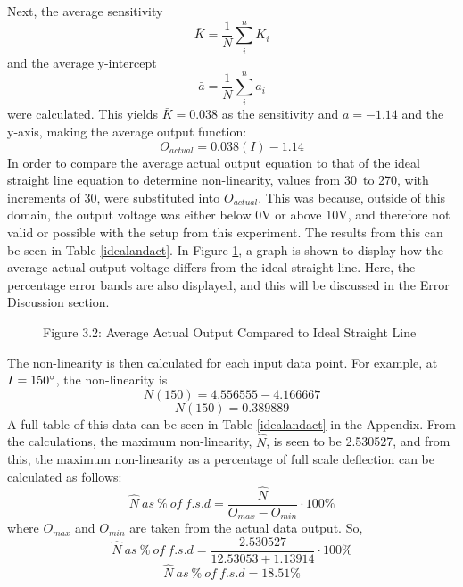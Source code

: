 \documentclass[a4,11pt]{article}
\begin{document}
Next, the average sensitivity
$$\bar{K}= \frac{1}{N}\sum_{i}^{n}{K_i}$$
and the average y-intercept
$$\bar{a}= \frac{1}{N}\sum_{i}^{n}{a_i}$$
were calculated. This yields $\bar{K}=0.038$ as the sensitivity and $\bar{a}=-1.14$ and the y-axis, making the average output function:
$$O_{actual}=0.038(I)-1.14$$
In order to compare the average actual output equation to that of the ideal straight line equation to determine non-linearity, values from 30\degree\ to 270\degree, with increments of 30\degree, were substituted into $O_{actual}$. This was because, outside of this domain, the output voltage was either below 0V or above 10V, and therefore not valid or possible with the setup from this experiment. The results from this can be seen in Table \ref{idealandact}. In Figure \ref{fig:actual}, a graph is shown to display how the average actual output voltage differs from the ideal straight line. Here, the percentage error bands are also displayed, and this will be discussed in the Error Discussion section.	

\begin{figure}[h]
	\centering
	\label{fig:actual}
	Figure 3.2: Average Actual Output Compared to Ideal Straight Line
\end{figure}

The non-linearity is then calculated for each input data point. For example, at $I=150\degree$, the non-linearity is
$$N(150)=4.556555-4.166667$$
$$N(150)=0.389889$$
A full table of this data can be seen in Table \ref{idealandact} in the Appendix. From the calculations, the maximum non-linearity, $\hat{N}$, is seen to be 2.530527, and from this, the maximum non-linearity as a percentage of full scale deflection can be calculated as follows:
$$\hat{N}\ as\ \%\ of\ f.s.d=\frac{\hat{N}}{O_{max}-O_{min}}\cdot 100\%$$
where $O_{max}$ and $O_{min}$ are taken from the actual data output. So,
$$\hat{N}\ as\ \%\ of\ f.s.d=\frac{2.530527}{12.53053+1.13914}\cdot 100\%$$
$$\hat{N}\ as\ \%\ of\ f.s.d=18.51\%$$
\end{document}
